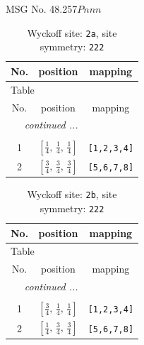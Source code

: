\documentclass[fleqn,8pt]{jsarticle}
\begin{document}
\setcounter{MaxMatrixCols}{32}

\renewcommand{\tablename}{Table~}
\renewcommand{\figurename}{Figure~}
\begin{center}
\LARGE
MSG No. 48.257\quad$Pnnn$
\end{center}
\renewcommand{\arraystretch}{1.2}
\begin{longtable}{ccc}
\caption{Wyckoff site: {\tt 2a}, site symmetry: {\tt 222}}
 \\
 \hline \hline
No. & position & mapping \\ \hline \endfirsthead

\multicolumn{2}{l}{\tablename\ \thetable{}} \\
 \hline \hline
No. & position & mapping \\ \hline \endhead

 \hline \hline
\multicolumn{2}{r}{\footnotesize\it continued ...} \\ \endfoot

 \hline \hline
\multicolumn{2}{r}{} \\ \endlastfoot

1 & $\left[ \frac{1}{4},\, \frac{1}{4},\, \frac{1}{4} \right]$ & {\tt [1,2,3,4]} \\ \hline
2 & $\left[ \frac{3}{4},\, \frac{3}{4},\, \frac{3}{4} \right]$ & {\tt [5,6,7,8]} \\
\end{longtable}
\renewcommand{\arraystretch}{1.2}
\begin{longtable}{ccc}
\caption{Wyckoff site: {\tt 2b}, site symmetry: {\tt 222}}
 \\
 \hline \hline
No. & position & mapping \\ \hline \endfirsthead

\multicolumn{2}{l}{\tablename\ \thetable{}} \\
 \hline \hline
No. & position & mapping \\ \hline \endhead

 \hline \hline
\multicolumn{2}{r}{\footnotesize\it continued ...} \\ \endfoot

 \hline \hline
\multicolumn{2}{r}{} \\ \endlastfoot

1 & $\left[ \frac{3}{4},\, \frac{1}{4},\, \frac{1}{4} \right]$ & {\tt [1,2,3,4]} \\ \hline
2 & $\left[ \frac{1}{4},\, \frac{3}{4},\, \frac{3}{4} \right]$ & {\tt [5,6,7,8]} \\
\end{longtable}
\end{document}
